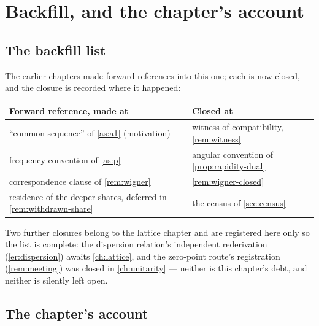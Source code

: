 \documentclass[11pt]{amsbook}
\theoremstyle{plain}
\theoremstyle{definition}
\theoremstyle{remark}
\begin{document}
\section{Backfill, and the chapter's account}\label{sec:backfill}

\subsection{The backfill list}\label{sec:backfill-list}

The earlier chapters made forward references into this one; each is now closed, and the closure is recorded where it happened:
\begin{center}
\begin{tabular}{@{}p{6.2cm}p{6.6cm}@{}}
\toprule
Forward reference, made at & Closed at \\
\midrule
``common sequence'' of \cref{as:a1} (motivation) & witness of compatibility, \cref{rem:witness} \\
frequency convention of \cref{as:p} & angular convention of \cref{prop:rapidity-dual} \\
correspondence clause of \cref{rem:wigner} & \cref{rem:wigner-closed} \\
residence of the deeper shares, deferred in \cref{rem:withdrawn-share} & the census of \cref{sec:census} \\
\bottomrule
\end{tabular}
\end{center}
Two further closures belong to the lattice chapter and are registered here only so the list is complete: the dispersion relation's independent rederivation (\cref{er:dispersion}) awaits \cref{ch:lattice}, and the zero-point route's registration (\cref{rem:meeting}) was closed in \cref{ch:unitarity} --- neither is this chapter's debt, and neither is silently left open.

\subsection{The chapter's account}\label{sec:ch9-account}
\end{document}
